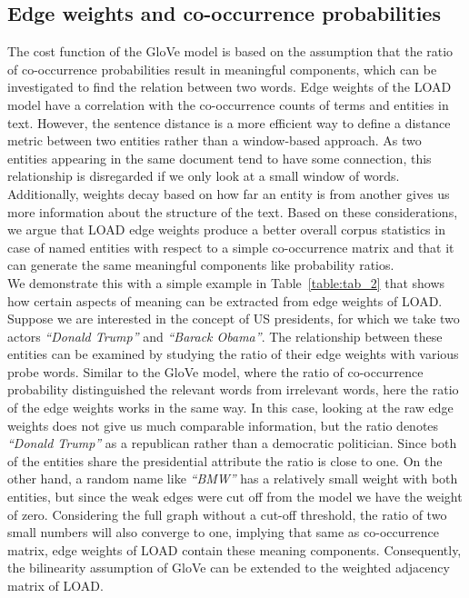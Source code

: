 \subsection{Edge weights and co-occurrence probabilities}\label{subsec:weights_load}
The cost function of the GloVe model is based on the assumption that the ratio of co-occurrence probabilities result in meaningful components, which can be investigated to find the relation between two words. Edge weights of the LOAD model have a correlation with the co-occurrence counts of terms and entities in text. However, the sentence distance is a more efficient way to define a distance metric between two entities rather than a window-based approach. As two entities appearing in the same document tend to have some connection, this relationship is disregarded if we only look at a small window of words. Additionally, weights decay based on how far an entity is from another gives us more information about the structure of the text. Based on these considerations, we argue that LOAD edge weights produce a better overall corpus statistics in case of named entities with respect to a simple co-occurrence matrix and that it can generate the same meaningful components like probability ratios. \\
We demonstrate this with a simple example in Table~\ref{table:tab_2} that shows how certain aspects of meaning can be extracted from edge weights of LOAD. Suppose we are interested in the concept of US presidents, for which we take two actors \emph{``Donald Trump''} and \emph{``Barack Obama''}. The relationship between these entities can be examined by studying the ratio of their edge weights with various probe words. Similar to the GloVe model, where the ratio of co-occurrence probability distinguished the relevant words from irrelevant words, here the ratio of the edge weights works in the same way. In this case, looking at the raw edge weights does not give us much comparable information, but the ratio denotes \emph{``Donald Trump''} as a republican rather than a democratic politician. Since both of the entities share the presidential attribute the ratio is close to one. On the other hand, a random name like \emph{``BMW''} has a relatively small weight with both entities, but since the weak edges were cut off from the model we have the weight of zero. Considering the full graph without a cut-off threshold, the ratio of two small numbers will also converge to one, implying that same as co-occurrence matrix, edge weights of LOAD contain these meaning components. Consequently, the bilinearity assumption of GloVe can be extended to the weighted adjacency matrix of LOAD. 

